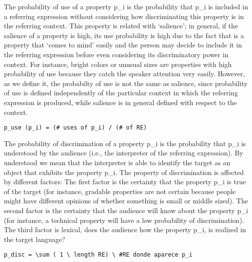 The probability of use of a property p\_i is the probability that p\_i is included in a referring expression without considering how discriminating this property is in the referring context. This property is related with ‘salience’; in general, if the salience of a property is high, its use probability is high due to the fact that is a property that ‘comes to mind’ easily and the person may decide to include it in the referring expression before even considering its discriminatory power in context. For instance, bright colors or unusual sizes are properties with high probability of use because they catch the speaker attention very easily. However, as we define it, the probabilty of use is not the same as salience, since probability of use is defined independently of the particular context in which the referring expression is produced, while salience is in general defined with respect to the context. 

\begin{verbatim}
p_use (p_i) = (# uses of p_i) / (# of RE)
\end{verbatim}
 
The probability of discrimination of a property p\_i is the probability that p\_i is understood by the audience (i.e., the interpreter of the referring expression). By understood we mean that the interpreter is able to identify the target as an object that exhibits the property p\_i. The property of discrimination is affected by different factors: The first factor is the certainty that the property p\_i is true of the target (for instance, gradable properties are not certain because people might have different opinions of whether something is small or middle sized). The second factor is the certainty that the audience will know about the property p\_i (for instance, a technical property will have a low probability of discrimination). The third factor is lexical, does the audience how the property p\_i, is realized in the target language?

\begin{verbatim}
p_disc = \sum ( 1 \ length RE) \ #RE donde aparece p_i
\end{verbatim}
